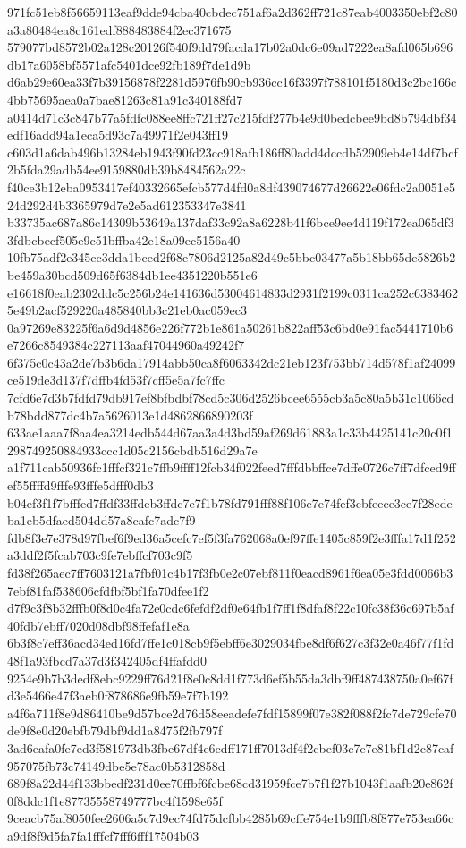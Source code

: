 \documentclass[11pt,a4paper]{article}
\begin{document}
{971fc51eb8f56659113eaf9dde94cba40cbdec751af6a2d362ff721c87eab4003350ebf2c80a3a80484ea8c161edf888483884f2ec371675
579077bd8572b02a128c20126f540f9dd79facda17b02a0dc6e09ad7222ea8afd065b696db17a6058bf5571afc5401dce92fb189f7de1d9b
d6ab29e60ea33f7b39156878f2281d5976fb90cb936cc16f3397f788101f5180d3c2bc166c4bb75695aea0a7bae81263c81a91c340188fd7
a0414d71c3c847b77a5fdfc088ee8ffc721ff27c215fdf277b4e9d0bedcbee9bd8b794dbf34edf16add94a1eca5d93c7a49971f2e043ff19
c603d1a6dab496b13284eb1943f90fd23cc918afb186ff80add4dccdb52909eb4e14df7bcf2b5fda29adb54ee9159880db39b8484562a22c
f40ce3b12eba0953417ef40332665efcb577d4fd0a8df439074677d26622e06fdc2a0051e524d292d4b3365979d7e2e5ad612353347e3841
b33735ac687a86c14309b53649a137daf33c92a8a6228b41f6bce9ee4d119f172ea065df33fdbcbecf505e9c51bffba42e18a09ec5156a40
10fb75adf2e345cc3dda1bced2f68e7806d2125a82d49c5bbc03477a5b18bb65de5826b2be459a30bcd509d65f6384db1ee4351220b551e6
e16618f0eab2302ddc5c256b24e141636d53004614833d2931f2199c0311ca252c63834625e49b2acf529220a485840bb3c21eb0ac059ec3
0a97269e83225f6a6d9d4856e226f772b1e861a50261b822aff53c6bd0e91fac5441710b6e7266c8549384c227113aaf47044960a49242f7
6f375c0c43a2de7b3b6da17914abb50ca8f6063342dc21eb123f753bb714d578f1af24099ce519de3d137f7dffb4fd53f7cff5e5a7fc7ffc
7cfd6e7d3b7fdfd79db917ef8bfbdbf78cd5c306d2526bcee6555cb3a5c80a5b31c1066cdb78bdd877dc4b7a5626013e1d4862866890203f
633ae1aaa7f8aa4ea3214edb544d67aa3a4d3bd59af269d61883a1c33b4425141c20c0f1298749250884933ccc1d05c2156cbdb516d29a7e
a1f711cab50936fc1fffcf321c7ffb9ffff12fcb34f022feed7fffdbbffce7dffe0726c7ff7dfced9ffef55ffffd9fffe93fffe5dfff0db3
b04ef3f1f7bfffed7ffdf33ffdeb3ffdc7e7f1b78fd791fff88f106e7e74fef3cbfeece3ce7f28edeba1eb5dfaed504dd57a8cafc7adc7f9
fdb8f3e7e378d97fbef6f9ed36a5cefc7ef5f3fa762068a0ef97ffe1405c859f2e3fffa17d1f252a3ddf2f5fcab703c9fe7ebffcf703c9f5
fd38f265aec7ff7603121a7fbf01c4b17f3fb0e2c07ebf811f0eacd8961f6ea05e3fdd0066b37ebf81faf538606cfdfbf5bf1fa70dfee1f2
d7f9c3f8b32fffb0f8d0c4fa72e0cdc6fefdf2df0e64fb1f7ff1f8dfaf8f22c10fc38f36c697b5af40fdb7ebff7020d08dbf98ffefaf1e8a
6b3f8c7eff36acd34ed16fd7ffe1c018cb9f5ebff6e3029034fbe8df6f627c3f32e0a46f77f1fd48f1a93fbcd7a37d3f342405df4ffafdd0
9254e9b7b3dedf8ebc9229ff76d21f8e0c8dd1f773d6ef5b55da3dbf9ff487438750a0ef67fd3e5466e47f3aeb0f878686e9fb59e7f7b192
a4f6a711f8e9d86410be9d57bce2d76d58eeadefe7fdf15899f07e382f088f2fc7de729cfe70de9f8e0d20ebfb79dbf9dd1a8475f2fb797f
3ad6eafa0fe7ed3f581973db3fbe67df4e6cdff171ff7013df4f2cbef03c7e7e81bf1d2c87caf957075fb73c74149dbe5e78ac0b5312858d
689f8a22d44f133bbedf231d0ee70ffbf6fcbe68cd31959fce7b7f1f27b1043f1aafb20e862f0f8ddc1f1e87735558749777bc4f1598e65f
9ceacb75af8050fee2606a5c7d9ec74fd75dcfbb4285b69cffe754e1b9fffb8f877e753ea66ca9df8f9d5fa7fa1fffcf7fff6fff17504b03
}
\end{document}
